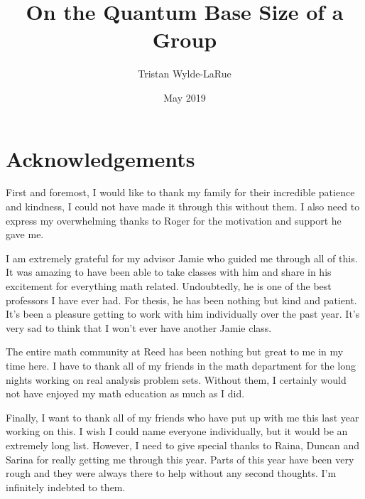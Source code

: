 
\title{On the Quantum Base Size of a Group}
\author{Tristan Wylde-LaRue}
\date{May 2019}






  \maketitle
  \frontmatter %
  \pagestyle{empty} %

    \chapter*{Acknowledgements}
    First and foremost, I would like to thank my family for their incredible patience and kindness, I could not 
    have made it through this without them. I also need to express my overwhelming thanks to Roger for the 
    motivation and support he gave me.

    I am extremely grateful for my advisor Jamie who guided me through all of this. It was amazing to have been 
    able to take classes with him and share in his excitement for everything math related. Undoubtedly, he is one 
    of the best professors I have ever had. For thesis, he has been nothing but kind and patient. It's been a 
    pleasure getting to work with him individually over the past year. It's very sad to think that I won't ever 
    have another Jamie class.

    The entire math community at Reed has been nothing but great to me in my time here. I have to thank all of my 
    friends in the math department for the long nights working on real analysis problem sets. Without them, I 
    certainly would not have enjoyed my math education as much as I did.

    Finally, I want to thank all of my friends who have put up with me this last year working on this. I wish I 
    could name everyone individually, but it would be an extremely long list. However, I need to give special 
    thanks to Raina, Duncan and Sarina for really getting me through this year. Parts of this year have been very 
    rough and they were always there to help without any second thoughts. I'm infinitely indebted to them.


